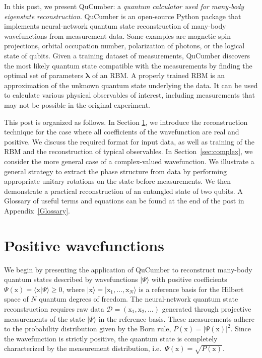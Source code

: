 \documentclass[submission, Phys, hidelnks]{SciPost}
\newcommand{\x}{\bm{\mathrm{x}}}
\begin{document}
In this post, we present QuCumber: a {\it quantum calculator used for many-body eigenstate reconstruction}. 
QuCumber is an open-source Python package that implements neural-network quantum state reconstruction of many-body wavefunctions from measurement data. 
Some examples are magnetic spin projections, orbital occupation number, polarization of photons, or the logical state of qubits. 
Given a training dataset of measurements, QuCumber discovers the most likely quantum state compatible with the measurements by finding the optimal set of parameters $\bm{\lambda}$ of an RBM. 
A properly trained RBM is an approximation of the unknown quantum state underlying the data. 
It can be used to calculate various physical observables of interest, including measurements that may not be possible in the original experiment.

This post is organized as follows. 
In Section \ref{sec:positive}, we introduce the reconstruction technique for the case where all coefficients of the wavefunction  are
real and positive. 
We discuss the required format for input data, as well as training of the RBM and the reconstruction of typical observables. In Section~\ref{sec:complex}, we consider the more general case of a complex-valued wavefunction. 
We illustrate a general strategy to extract the phase structure from data by performing appropriate unitary rotations on the state before measurements. 
We then demonstrate a practical reconstruction of an entangled state of two qubits. A Glossary of useful terms and equations can be found at the end of the post in Appendix~\ref{Glossary}.

\section{Positive wavefunctions}\label{sec:positive}
We begin by presenting the application of QuCumber to reconstruct many-body quantum states described by wavefunctions $|\Psi\rangle$ with positive coefficients $\Psi(\x)=\langle\x|\Psi\rangle \ge 0$, 
where $|\x\rangle=|\mathrm{x}_1,\dots,\mathrm{x}_N\rangle$ is a reference basis for the Hilbert space of $N$ quantum degrees of freedom. 
The neural-network quantum state reconstruction requires raw data $\mathcal{D}=(\x_1,\x_2,\dots)$ generated through projective measurements of the state $|\Psi\rangle$ in the reference basis. 
These measurements adhere to the probability distribution given by the Born rule, $P(\x)=|\Psi(\x)|^2$. 
Since the wavefunction is strictly positive, the quantum state is completely characterized by the measurement distribution, i.e.~$\Psi(\x)=\sqrt{P(\x)}$. 
\end{document}

